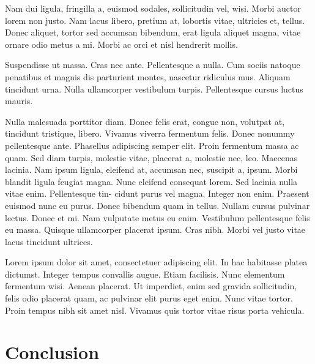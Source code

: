 \documentclass{article}
\begin{document}
Nam dui ligula, fringilla a, euismod sodales, sollicitudin vel, wisi. Morbi auctor lorem non justo.
Nam lacus libero, pretium at, lobortis vitae, ultricies et, tellus. Donec aliquet, tortor sed accumsan
bibendum, erat ligula aliquet magna, vitae ornare odio metus a mi. Morbi ac orci et nisl hendrerit
mollis.

Suspendisse ut massa. Cras nec ante. Pellentesque a nulla. Cum sociis natoque penatibus
et magnis dis parturient montes, nascetur ridiculus mus. Aliquam tincidunt urna. Nulla ullamcorper
vestibulum turpis. Pellentesque cursus luctus mauris.

Nulla malesuada porttitor diam. Donec felis erat, congue non, volutpat at, tincidunt tristique, libero.
Vivamus viverra fermentum felis. Donec nonummy pellentesque ante. Phasellus adipiscing semper 	elit.
Proin fermentum massa ac quam. Sed diam turpis, molestie vitae, placerat a, molestie nec, leo.
Maecenas lacinia. Nam ipsum ligula, eleifend at, accumsan nec, suscipit a, ipsum. Morbi blandit
ligula feugiat magna. Nunc eleifend consequat lorem. Sed lacinia nulla vitae enim. Pellentesque tin-
cidunt purus vel magna. Integer non enim. Praesent euismod nunc eu purus. Donec bibendum quam
in tellus. Nullam cursus pulvinar lectus. Donec et mi. Nam vulputate metus eu enim. Vestibulum
pellentesque felis eu massa.
Quisque ullamcorper placerat ipsum. Cras nibh. Morbi vel justo vitae lacus tincidunt ultrices.

Lorem
ipsum dolor sit amet, consectetuer adipiscing elit. In hac habitasse platea dictumst. Integer tempus
convallis augue. Etiam facilisis. Nunc elementum fermentum wisi. Aenean placerat. Ut imperdiet,
enim sed gravida sollicitudin, felis odio placerat quam, ac pulvinar elit purus eget enim. Nunc vitae
tortor. Proin tempus nibh sit amet nisl. Vivamus quis tortor vitae risus porta vehicula.


\section{Conclusion}
\label{sec:conclusion}
\end{document}

